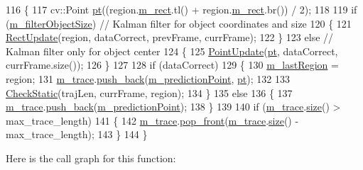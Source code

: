 \begin{DoxyCode}
116 \{
117     cv::Point \mbox{\hyperlink{rings_8cpp_af69bbacaaf68a115b351c5d1e29c3cc8}{pt}}((region.\mbox{\hyperlink{class_c_region_a6f68304e90428db829cc38792fa3e1e8}{m\_rect}}.tl() + region.\mbox{\hyperlink{class_c_region_a6f68304e90428db829cc38792fa3e1e8}{m\_rect}}.br()) / 2);
118 
119     \textcolor{keywordflow}{if} (\mbox{\hyperlink{class_c_track_a5573dab5b9fe2e5143204355b8146c87}{m\_filterObjectSize}}) \textcolor{comment}{// Kalman filter for object coordinates and size}
120     \{
121         \mbox{\hyperlink{class_c_track_a0f4fc1dc488e8ae339e988962dae6873}{RectUpdate}}(region, dataCorrect, prevFrame, currFrame);
122     \}
123     \textcolor{keywordflow}{else} \textcolor{comment}{// Kalman filter only for object center}
124     \{
125         \mbox{\hyperlink{class_c_track_a19453a750a9ec71d6f3465f6031ad64b}{PointUpdate}}(\mbox{\hyperlink{rings_8cpp_af69bbacaaf68a115b351c5d1e29c3cc8}{pt}}, dataCorrect, currFrame.size());
126     \}
127 
128     \textcolor{keywordflow}{if} (dataCorrect)
129     \{
130         \mbox{\hyperlink{class_c_track_a5af91fbfad7ebf07bd0f681f915e440c}{m\_lastRegion}} = region;
131         \mbox{\hyperlink{class_c_track_adf88ff8678ec928ac3ca764f7308b96f}{m\_trace}}.\mbox{\hyperlink{class_trace_a5bca62bb3439cd12991f848a875d4085}{push\_back}}(\mbox{\hyperlink{class_c_track_a8ee3f8baaf290aeb113f34c26a446a76}{m\_predictionPoint}}, \mbox{\hyperlink{rings_8cpp_af69bbacaaf68a115b351c5d1e29c3cc8}{pt}});
132 
133         \mbox{\hyperlink{class_c_track_ab16e6724f0e9d22301d46efda587f567}{CheckStatic}}(trajLen, currFrame, region);
134     \}
135     \textcolor{keywordflow}{else}
136     \{
137         \mbox{\hyperlink{class_c_track_adf88ff8678ec928ac3ca764f7308b96f}{m\_trace}}.\mbox{\hyperlink{class_trace_a5bca62bb3439cd12991f848a875d4085}{push\_back}}(\mbox{\hyperlink{class_c_track_a8ee3f8baaf290aeb113f34c26a446a76}{m\_predictionPoint}});
138     \}
139 
140     \textcolor{keywordflow}{if} (\mbox{\hyperlink{class_c_track_adf88ff8678ec928ac3ca764f7308b96f}{m\_trace}}.\mbox{\hyperlink{class_trace_a1bc7111ffb39ba415c2553677fc2f3ba}{size}}() > max\_trace\_length)
141     \{
142         \mbox{\hyperlink{class_c_track_adf88ff8678ec928ac3ca764f7308b96f}{m\_trace}}.\mbox{\hyperlink{class_trace_a407c1b44333105aff314ae6f7f0ab7eb}{pop\_front}}(\mbox{\hyperlink{class_c_track_adf88ff8678ec928ac3ca764f7308b96f}{m\_trace}}.\mbox{\hyperlink{class_trace_a1bc7111ffb39ba415c2553677fc2f3ba}{size}}() - max\_trace\_length);
143     \}
144 \}
\end{DoxyCode}
Here is the call graph for this function\+:\nopagebreak
